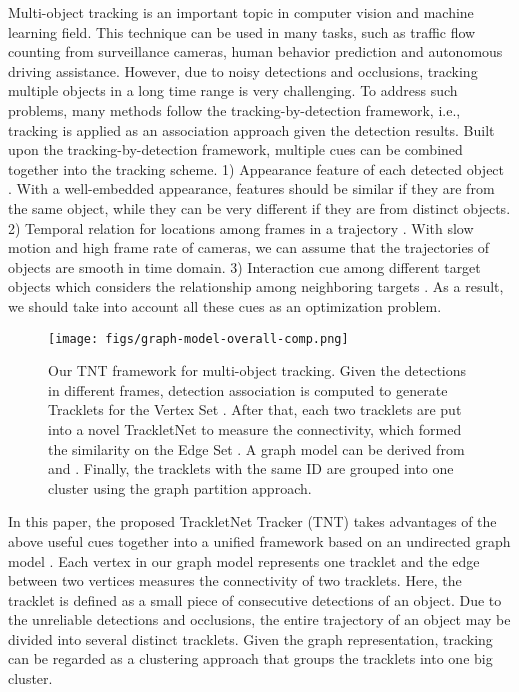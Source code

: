\documentclass[10pt,twocolumn,letterpaper]{article}
\begin{document}
Multi-object tracking is an important topic in computer vision and machine learning field. This technique can be used in many tasks, such as traffic flow counting from surveillance cameras, human behavior prediction and autonomous driving assistance. 
However, due to noisy detections and occlusions, tracking multiple objects in a long time range is very challenging. To address such problems, many methods follow the tracking-by-detection framework, i.e., tracking is applied as an association approach given the detection results.
Built upon the tracking-by-detection framework, multiple cues can be combined together into the tracking scheme. 1) Appearance feature of each detected object \cite{ristani2018features,zhang2017multi,tang2017multiple,wojke2017simple}. With a well-embedded appearance, features should be similar if they are from the same object, while they can be very different if they are from distinct objects.
2) Temporal relation for locations among frames in a trajectory \cite{milan2017online}. With slow motion and high frame rate of cameras, we can assume that the trajectories of objects 
are smooth in time domain. 
3) Interaction cue among different target objects which considers the relationship among neighboring targets 
\cite{sadeghian2017tracking}. 
As a result, we should take into account all these cues as an optimization problem. 

\begin{figure}[t]
\begin{center}
\texttt{[image: figs/graph-model-overall-comp.png]}
\end{center}
   \caption{Our TNT framework for multi-object tracking. Given the detections in different frames, detection association is computed to generate Tracklets for the Vertex Set . After that, each two tracklets are put into a novel TrackletNet to measure the connectivity, which formed the similarity on the Edge Set . A graph model  can be derived from  and . Finally, the tracklets with the same ID are grouped into one cluster using the graph partition approach. }
\label{fig:overall-flow}
\end{figure}

In this paper, the proposed TrackletNet Tracker (TNT) takes advantages of the above useful cues together into a unified framework based on an undirected graph model \cite{milan2016multi}. Each vertex in our graph model represents one tracklet and the edge between two vertices measures the connectivity
of two tracklets. Here, the tracklet is defined as a small piece of consecutive detections of an object. Due to the unreliable detections and occlusions, the entire trajectory of an object may be divided into several distinct tracklets.
Given the graph representation, tracking can be regarded as a clustering approach that groups the tracklets into one big cluster. 
\end{document}
